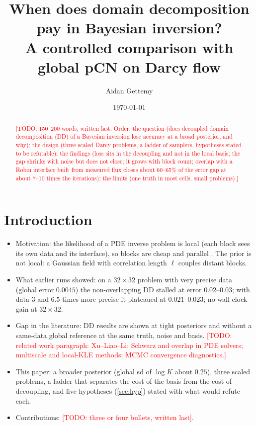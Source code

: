 \documentclass[11pt]{article}
\title{When does domain decomposition pay in Bayesian inversion?\\
A controlled comparison with global pCN on Darcy flow}
\author{Aidan Gettemy \and \todo{co-authors}}
\date{\today}
\newcommand{\todo}[1]{\textcolor{red}{[TODO: #1]}}
\begin{document}
\maketitle

\begin{abstract}
\todo{150--200 words, written last. Order: the question (does decoupled domain decomposition (DD) of a Bayesian inversion lose accuracy at a broad posterior, and why); the design (three scaled Darcy problems, a ladder of samplers, hypotheses stated to be refutable); the findings (loss sits in the decoupling and not in the local basis; the gap shrinks with noise but does not close; it grows with block count; overlap with a Robin interface built from measured flux closes about 60--65\% of the error gap at about 7--10 times the iterations); the limits (one truth in most cells, small problems).}
\end{abstract}

\section{Introduction}\label{sec:intro}
\begin{itemize}
\item Motivation: the likelihood of a PDE inverse problem is local (each block sees its own data and its interface), so blocks are cheap and parallel \citep{XuLiaoLi2022}. The prior is not local: a Gaussian field with correlation length $\ell$ couples distant blocks.
\item What earlier runs showed: on a $32\times32$ problem with very precise data (global error $0.0045$) the non-overlapping DD stalled at error $0.02$--$0.03$; with data $3$ and $6.5$ times more precise it plateaued at $0.021$--$0.023$; no wall-clock gain at $32\times32$.
\item Gap in the literature: DD results are shown at tight posteriors and without a same-data global reference at the same truth, noise and basis. \todo{related work paragraph: Xu--Liao--Li; Schwarz and overlap in PDE solvers; multiscale and local-KLE methods; MCMC convergence diagnostics.}
\item This paper: a broader posterior (global sd of $\log K$ about $0.25$), three scaled problems, a ladder that separates the cost of the basis from the cost of decoupling, and five hypotheses (\cref{sec:hyp}) stated with what would refute each.
\item Contributions: \todo{three or four bullets, written last}.
\end{itemize}
\end{document}

